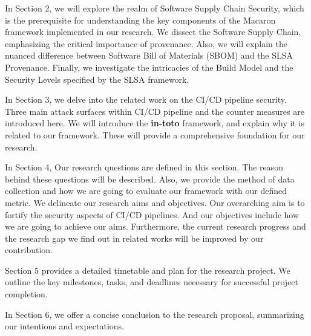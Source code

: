 In Section 2, we will explore the realm of Software Supply Chain Security, which is the prerequisite
for understanding the key components of the Macaron framework implemented in our research.
We dissect the Software Supply Chain, emphasizing the critical importance of provenance. 
Also, we will explain the nuanced difference between Software Bill of Materials (SBOM) and the SLSA Provenance.
Finally, we investigate the intricacies of the Build Model and the Security Levels specified by the SLSA framework.

In Section 3, we delve into the related work on the CI/CD pipeline security. Three main 
attack surfaces within CI/CD pipeline and the counter measures are introduced here. We will introduce the \textbf{in-toto}
framework, and explain why it is related to our framework. These will provide a comprehensive foundation for our research. 

In Section 4, Our research questions are defined in this section. The reason behind these questions will be described.
Also, we provide the method of data collection and how we are going to evaluate our framework with our defined metric. 
We delineate our research aims and objectives. Our overarching aim is to fortify the security aspects of CI/CD pipelines. 
And our objectives include how we are going to achieve our aims. Furthermore, the current research 
progress and the research gap we find out in related works will be improved by our contribution.

Section 5 provides a detailed timetable and plan for the research project. 
We outline the key milestones, tasks, and deadlines necessary for successful project completion.

In Section 6, we offer a concise conclusion to the research proposal, summarizing our intentions and expectations.